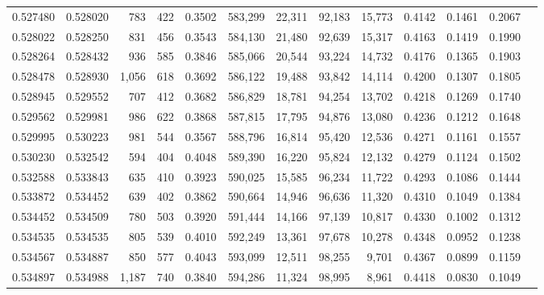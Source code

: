 \begin{tabular}{rrrrrrrrrrrrr}
0.527480 & 0.528020 &    783 &   422 &                                     0.3502 & 583,299 &  22,311 &  92,183 &  15,773 & 0.4142 & 0.1461 & 0.2067 \\
0.528022 & 0.528250 &    831 &   456 &                                     0.3543 & 584,130 &  21,480 &  92,639 &  15,317 & 0.4163 & 0.1419 & 0.1990 \\
0.528264 & 0.528432 &    936 &   585 &                                     0.3846 & 585,066 &  20,544 &  93,224 &  14,732 & 0.4176 & 0.1365 & 0.1903 \\
0.528478 & 0.528930 &  1,056 &   618 &                                     0.3692 & 586,122 &  19,488 &  93,842 &  14,114 & 0.4200 & 0.1307 & 0.1805 \\
0.528945 & 0.529552 &    707 &   412 &                                     0.3682 & 586,829 &  18,781 &  94,254 &  13,702 & 0.4218 & 0.1269 & 0.1740 \\
0.529562 & 0.529981 &    986 &   622 &                                     0.3868 & 587,815 &  17,795 &  94,876 &  13,080 & 0.4236 & 0.1212 & 0.1648 \\
0.529995 & 0.530223 &    981 &   544 &                                     0.3567 & 588,796 &  16,814 &  95,420 &  12,536 & 0.4271 & 0.1161 & 0.1557 \\
0.530230 & 0.532542 &    594 &   404 &                                     0.4048 & 589,390 &  16,220 &  95,824 &  12,132 & 0.4279 & 0.1124 & 0.1502 \\
0.532588 & 0.533843 &    635 &   410 &                                     0.3923 & 590,025 &  15,585 &  96,234 &  11,722 & 0.4293 & 0.1086 & 0.1444 \\
0.533872 & 0.534452 &    639 &   402 &                                     0.3862 & 590,664 &  14,946 &  96,636 &  11,320 & 0.4310 & 0.1049 & 0.1384 \\
0.534452 & 0.534509 &    780 &   503 &                                     0.3920 & 591,444 &  14,166 &  97,139 &  10,817 & 0.4330 & 0.1002 & 0.1312 \\
0.534535 & 0.534535 &    805 &   539 &                                     0.4010 & 592,249 &  13,361 &  97,678 &  10,278 & 0.4348 & 0.0952 & 0.1238 \\
0.534567 & 0.534887 &    850 &   577 &                                     0.4043 & 593,099 &  12,511 &  98,255 &   9,701 & 0.4367 & 0.0899 & 0.1159 \\
0.534897 & 0.534988 &  1,187 &   740 &                                     0.3840 & 594,286 &  11,324 &  98,995 &   8,961 & 0.4418 & 0.0830 & 0.1049 \\

\end{tabular}
